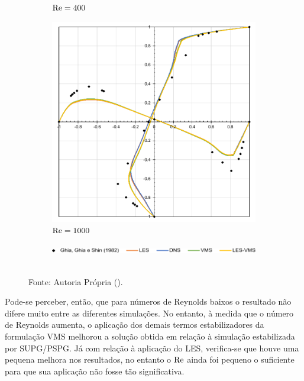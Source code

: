 \begin{figure}[h!]
\begin{subfigure}{0.49\textwidth}
        \caption{$\mathrm{Re}=400$}
    \end{subfigure}
    \begin{subfigure}{0.49\textwidth}
        \centering
        \includegraphics[width=\linewidth]{Figuras/cavity3D/Re1000.pdf}
        \caption{$\mathrm{Re}=1000$}
    \end{subfigure}
    \begin{subfigure}{\textwidth}
        \centering
        \includegraphics[width=0.5\linewidth]{Figuras/cavity3D/legenda.pdf}
    \end{subfigure}
    \\Fonte: Autoria Própria (\the\year).
    \label{fig:cavity-results4}
\end{figure}

Pode-se perceber, então, que para números de Reynolds baixos o resultado não difere muito entre as diferentes simulações. No entanto, à medida que o número de Reynolds aumenta, o aplicação dos demais termos estabilizadores da formulação VMS melhorou a solução obtida em relação à simulação estabilizada por SUPG/PSPG. Já com relação à aplicação do LES, verifica-se que houve uma pequena melhora nos resultados, no entanto o $\mathrm{Re}$ ainda foi pequeno o suficiente para que sua aplicação não fosse tão significativa.

